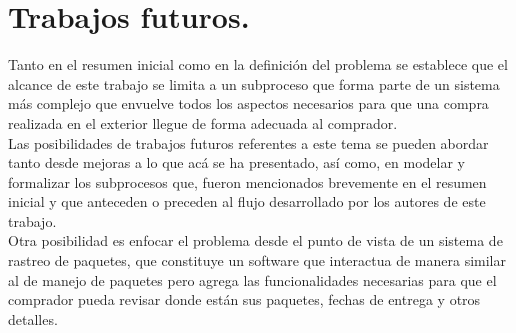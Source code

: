 \documentclass[12pt,a4paper,table]{article}
\begin{document}
\section{Trabajos futuros.}
Tanto en el resumen inicial como en la definición del problema se establece que el alcance de este trabajo se limita a un subproceso que forma parte de un sistema más complejo que envuelve todos los aspectos necesarios para que una compra realizada en el exterior llegue de forma adecuada al comprador.\\[\baselineskip]
\indent Las posibilidades de trabajos futuros referentes a este tema se pueden abordar tanto desde mejoras a lo que acá se ha presentado, así como, en modelar y formalizar los subprocesos que, fueron mencionados brevemente en el resumen inicial y que anteceden o preceden al flujo desarrollado por los autores de este trabajo.\\[\baselineskip]
\indent Otra posibilidad es enfocar el problema desde el punto de vista de un sistema de rastreo de paquetes, que constituye un software que interactua de manera similar al de manejo de paquetes pero agrega las funcionalidades necesarias para que el comprador pueda revisar donde están sus paquetes, fechas de entrega y otros detalles.

\newpage
\end{document}
